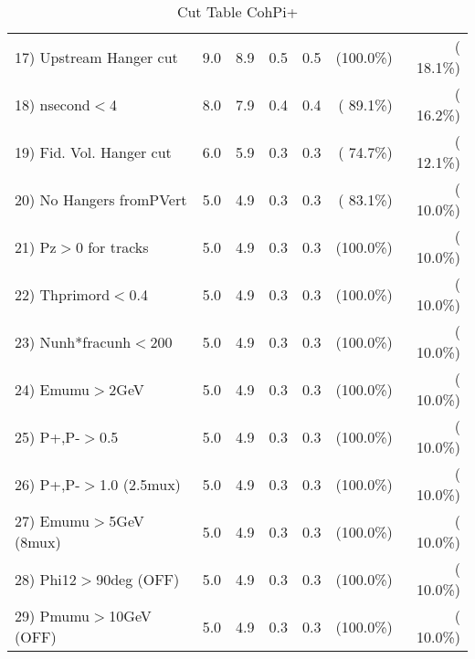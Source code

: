 \begin{table}[h!]
\begin{tabular}{||l||r|r|r|r|r|r||}
 17) Upstream Hanger cut  &          9.0 &          8.9 &          0.5 &          0.5 & (100.0\%) & ( 18.1\%) \\
 18) nsecond$<$4          &          8.0 &          7.9 &          0.4 &          0.4 & ( 89.1\%) & ( 16.2\%) \\
 19) Fid. Vol. Hanger cut &          6.0 &          5.9 &          0.3 &          0.3 & ( 74.7\%) & ( 12.1\%) \\
 20) No Hangers fromPVert &          5.0 &          4.9 &          0.3 &          0.3 & ( 83.1\%) & ( 10.0\%) \\
 21) Pz$>$0 for tracks    &          5.0 &          4.9 &          0.3 &          0.3 & (100.0\%) & ( 10.0\%) \\
 22) Thprimord$<$0.4      &          5.0 &          4.9 &          0.3 &          0.3 & (100.0\%) & ( 10.0\%) \\
 23) Nunh*fracunh$<$200   &          5.0 &          4.9 &          0.3 &          0.3 & (100.0\%) & ( 10.0\%) \\
 24) Emumu$>$2GeV         &          5.0 &          4.9 &          0.3 &          0.3 & (100.0\%) & ( 10.0\%) \\
 25) P+,P-$>$0.5          &          5.0 &          4.9 &          0.3 &          0.3 & (100.0\%) & ( 10.0\%) \\
 26) P+,P-$>$1.0 (2.5mux) &          5.0 &          4.9 &          0.3 &          0.3 & (100.0\%) & ( 10.0\%) \\
 27) Emumu$>$5GeV  (8mux) &          5.0 &          4.9 &          0.3 &          0.3 & (100.0\%) & ( 10.0\%) \\
 28) Phi12$>$90deg  (OFF) &          5.0 &          4.9 &          0.3 &          0.3 & (100.0\%) & ( 10.0\%) \\
 29) Pmumu$>$10GeV  (OFF) &          5.0 &          4.9 &          0.3 &          0.3 & (100.0\%) & ( 10.0\%) \\
 \hline
 \hline
 \end{tabular}
 \caption{Cut Table  CohPi+   }
 \label{tab-cutcohjpsi-mumu_nuecc}
 \end{table}
